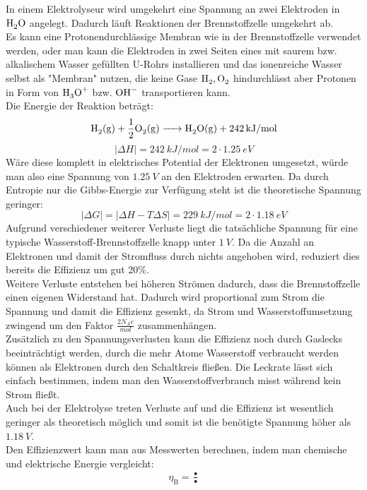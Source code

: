 \documentclass[a4paper,12pt,bibtotocnumbered]{scrartcl}
\numberwithin{equation}{section} %
\begin{document}
In einem Elektrolyseur wird umgekehrt eine Spannung an zwei Elektroden in $\ce{H_2O}$ angelegt. Dadurch läuft Reaktionen der Brennstoffzelle umgekehrt ab. \\
Es kann eine Protonendurchlässige Membran wie in der Brennstoffzelle verwendet werden, oder man kann die Elektroden in zwei Seiten eines mit saurem bzw. alkalischem Wasser gefüllten U-Rohrs installieren und das ionenreiche Wasser selbst als "Membran" nutzen, die keine Gase $\ce{H_2},\ce{O_2}$ hindurchlässt aber Protonen in Form von $\ce{H_3O^+}$ bzw. $\ce{OH^-}$ transportieren kann.\\
\newpage
Die Energie der Reaktion beträgt:
\begin{equation}
\ce{H_2(g) + \frac{1}{2}O_2(g) -> H_2O(g) + \SI{242}{kJ\per mol}}
\end{equation}\begin{equation}
|\Delta H| = \SI{242}{kJ\per mol} = 2\cdot\SI{1,25}{eV}
\end{equation}
Wäre diese komplett in elektrisches Potential der Elektronen umgesetzt, würde man also eine Spannung von $\SI{1,25}{V}$ an den Elektroden erwarten. Da durch Entropie nur die Gibbs-Energie zur Verfügung steht ist die theoretische Spannung geringer: 
\begin{equation}
|\Delta G| = |\Delta H - T \Delta S| = \SI{229}{kJ\per mol} = 2\cdot\SI{1,18}{eV}
\end{equation}
Aufgrund verschiedener weiterer Verluste liegt die tatsächliche Spannung für eine typische Wasserstoff-Brennstoffzelle knapp unter $\SI{1}{V}$. Da die Anzahl an Elektronen und damit der Stromfluss durch nichts angehoben wird, reduziert dies bereits die Effizienz um gut $20\%$.\\
Weitere Verluste entstehen bei höheren Strömen dadurch, dass die Brennstoffzelle einen eigenen Widerstand hat. Dadurch wird proportional zum Strom die Spannung und damit die Effizienz gesenkt, da Strom und Wasserstoffumsetzung zwingend um den Faktor $\frac{2N_A e}{\si{mol}}$ zusammenhängen.\\
Zusätzlich zu den Spannungsverlusten kann die Effizienz noch durch Gaslecks beeinträchtigt werden, durch die mehr Atome Wasserstoff verbraucht werden können als Elektronen durch den Schaltkreis fließen. Die Leckrate lässt sich einfach bestimmen, indem man den Wasserstoffverbrauch misst während kein Strom fließt.\\
Auch bei der Elektrolyse treten Verluste auf und die Effizienz ist wesentlich geringer als theoretisch möglich und somit ist die benötigte Spannung höher als $\SI{1,18}{V}$.\\
Den Effizienzwert kann man aus Messwerten berechnen, indem man chemische und elektrische Energie vergleicht:
\begin{align}
\eta_\text{B} = \frac{•}{•}
\end{align}
\end{document}

